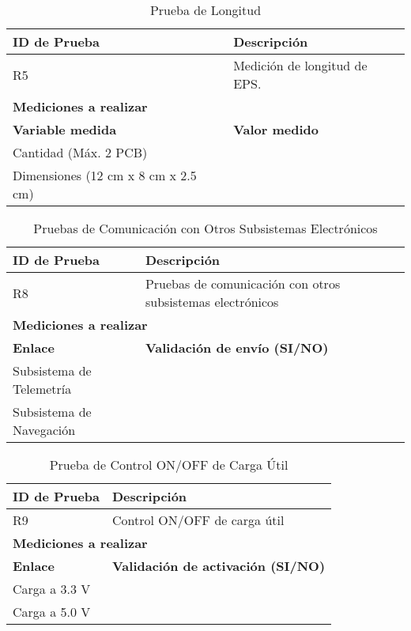 \begin{table}[h]
    \centering
    \begin{tabular}{|m{6.5cm}|m{6.5cm}|}
    \hline
        \textbf{ID de Prueba} & \textbf{Descripción} \\ \hline
        \centering R5 & Medición de longitud de EPS. \\ \hline
        \multicolumn{2}{|m{13cm}|}{\centering\textbf{Mediciones a realizar}} \\ \hline
        \textbf{Variable medida} & \textbf{Valor medido} \\ \hline
        Cantidad (Máx. 2 PCB) & ~ \\ \hline
        Dimensiones (12 cm x 8 cm x 2.5 cm) & ~ \\ \hline
    \end{tabular}
    \caption{Prueba de Longitud}
    \label{tab:dimensionmeasurement}
\end{table}



\begin{table}[h]
    \centering
    \begin{tabular}{|m{6.5cm}|m{6.5cm}|}
    \hline
        \textbf{ID de Prueba} & \textbf{Descripción} \\ \hline
        R8 & Pruebas de comunicación con otros subsistemas electrónicos \\ \hline
        \multicolumn{2}{|l|}{\textbf{\hspace{5 cm}Mediciones a realizar}} \\ \hline
        \textbf{Enlace} & \textbf{Validación de envío (SI/NO)} \\ \hline
        Subsistema de Telemetría & ~ \\ \hline
        Subsistema de Navegación & ~ \\ \hline
    \end{tabular}
    \caption{Pruebas de Comunicación con Otros Subsistemas Electrónicos}
    \label{tab:communicationtests}
\end{table}


\begin{table}[!ht]
    \centering
    \begin{tabular}{|m{6.5cm}|m{6.5cm}|}
    \hline
        \textbf{ID de Prueba} & \textbf{Descripción} \\ \hline
        R9 & Control ON/OFF de carga útil \\ \hline
        \multicolumn{2}{|l|}{\textbf{\hspace{5 cm}Mediciones a realizar}} \\ \hline
        \textbf{Enlace} & \textbf{Validación de activación (SI/NO)} \\ \hline
        Carga a 3.3 V & ~ \\ \hline
        Carga a 5.0 V & ~ \\ \hline
    \end{tabular}
    \caption{Prueba de Control ON/OFF de Carga Útil}
    \label{tab:payloadcontroltest}
\end{table}

